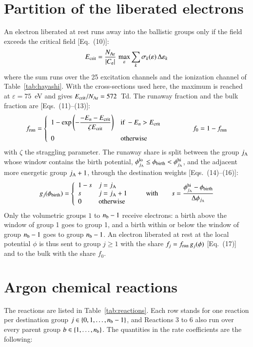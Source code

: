 \documentclass{warpdoc}
\newcommand{\alb}{\vspace{0.2cm}\\} %
\newcommand{\mfd}{\displaystyle}
\begin{document}
\section{Partition of the liberated electrons}

An electron liberated at rest runs away into the ballistic groups only if the field exceeds the critical field [Eq.~(10)]:
$$
E_{\rm crit}=\frac{N_{\rm Ar}}{|C_{\rm e}|}\,\max_{\varepsilon}\sum_k \sigma_k(\varepsilon)\,\Delta\varepsilon_k
$$
where the sum runs over the 25 excitation channels and the ionization channel of Table~\ref{tab:hayashi}. With the cross-sections used here, the maximum is reached at $\varepsilon=75$~eV and gives $E_{\rm crit}/N_{\rm Ar}=572$~Td. The runaway fraction and the bulk fraction are [Eqs.~(11)--(13)]:
$$
f_{\rm run}=\left\{\begin{array}{ll}\mfd 1-\exp\left(-\frac{-E_n-E_{\rm crit}}{\zeta E_{\rm crit}}\right) & \textrm{if } -E_n>E_{\rm crit}\alb 0 & \textrm{otherwise}\end{array}\right.
\qquad\qquad f_0=1-f_{\rm run}
$$
with $\zeta$ the straggling parameter. The runaway share is split between the group $j_{\rm A}$ whose window contains the birth potential, $\phi^{\rm lo}_{j_{\rm A}}\le\phi_{\rm birth}<\phi^{\rm hi}_{j_{\rm A}}$, and the adjacent more energetic group $j_{\rm A}+1$, through the destination weights [Eqs.~(14)--(16)]:
$$
g_j(\phi_{\rm birth})=\left\{\begin{array}{ll}1-s & j=j_{\rm A}\\ s & j=j_{\rm A}+1\\ 0 & \textrm{otherwise}\end{array}\right.
\qquad\textrm{with}\qquad
s=\frac{\phi^{\rm hi}_{j_{\rm A}}-\phi_{\rm birth}}{\Delta\phi_{j_{\rm A}}}
$$
Only the volumetric groups $1$ to $n_{\rm b}-1$ receive electrons: a birth above the window of group 1 goes to group 1, and a birth within or below the window of group $n_{\rm b}-1$ goes to group $n_{\rm b}-1$. An electron liberated at rest at the local potential $\phi$ is thus sent to group $j\ge1$ with the share $f_j=f_{\rm run}\,g_j(\phi)$ [Eq.~(17)] and to the bulk with the share $f_0$.


\section{Argon chemical reactions}\label{sec:reactions}

The reactions are listed in Table~\ref{tab:reactions}. Each row stands for one reaction per destination group $j\in\{0,1,\dots,n_{\rm b}-1\}$, and Reactions 3 to 6 also run over every parent group $b\in\{1,\dots,n_{\rm b}\}$. The quantities in the rate coefficients are the following:
\end{document}
